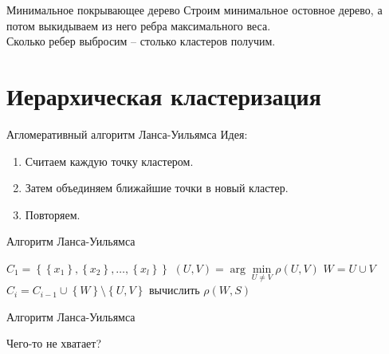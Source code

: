 \documentclass[10pt]{beamer}
\begin{document}
\begin{frame}{Минимальное покрывающее дерево}
	Строим минимальное остовное дерево, а потом выкидываем из него ребра максимального веса.\\
	\bigbreak
	Сколько ребер выбросим -- столько кластеров получим.
\end{frame}

\section{Иерархическая кластеризация}

\begin{frame}{Агломеративный алгоритм Ланса-Уильямса}
	\alert{Идея}:\\
	\begin{enumerate}
		\item Считаем каждую точку кластером. 
		\item Затем объединяем ближайшие точки в новый кластер. 
		\item Повторяем.
	\end{enumerate}
\end{frame}


\begin{frame}{Алгоритм Ланса-Уильямса}
	\begin{algorithmic}[1]
            \State ${C_1 = \left\{ \left\{ x_1\right\}, \left\{x_2 \right\}, \dots, \left\{x_l \right\} \right\}}$
            		\State ${(U, V) = \arg\min\limits_{U \neq V} \rho(U, V)}$
            		\State $W = U \cup V$
            		\State ${C_i = C_{i-1} \cup \left\{ W \right\}\setminus \left\{U, V \right\} }$
            			\State вычислить $\rho(W, S)$
            		\EndFor
            	\EndFor
        \EndFunction
    \end{algorithmic}   
\end{frame}
	
\begin{frame}{Алгоритм Ланса-Уильямса}
  \begin{center}
    Чего-то не хватает?  
  \end{center}
\end{frame}
\end{document}
